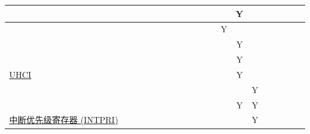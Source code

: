 \documentclass[main\_\_CN.tex]{subfiles}
\begin{document}
\begin{landscape}
\begin{tiny}
\begin{longtable}[c]{|m{2.5cm}|c|c|c|c|c|c|c|c|c|C{1.4cm}|c|c|c|c|c|c|c|c|c| }
     &  &  &  &  &  &  &  &  &  &  &  &  & Y &  &  &  &  &  &  \\ \hline
     &  &  &  &  &  &  &  &  &  &  &  & Y &  &  &  &  &  &  &  \\ \hline
     &  &  &  &  &  &  &  &  &  &  &  &  & Y &  &  &  &  &  &  \\ \hline
     &  &  &  &  &  &  &  &  &  &  &  &  & Y &  &  &  &  &  &  \\ \hline
    \hyperref[mod:uart]{UHCI} &  &  &  &  &  &  &  &  &  &  &  &  & Y &  &  &  &  &  &  \\ \hline
     &  &  &  &  &  &  &  &  &  &  &  &  &  & Y &  &  &  &  &  \\ \hline
      &  &  &  &  &  &  &  &  &  &  &  &  & Y & Y &  &  &  &  &  \\ \hline
    \hyperref[mod:riscvcpu]{中断优先级寄存器 (INTPRI)} &  &  &  &  &  &  &  &  &  &  &  &  &  & Y &  &  &  &  &  \\ \hline
\end{longtable}

\begin{longtable}[c]{|m{1.7cm}|c|c|c|c|c|c|c|c|c|C{1.5cm}|c|c|c|c|c|c|c|c|c| }


\end{longtable}
\end{tiny}
\end{landscape}
\end{document}
